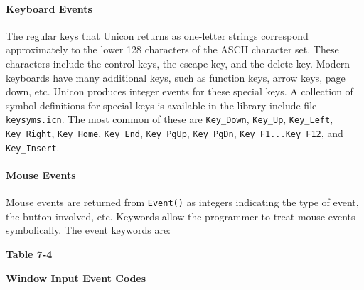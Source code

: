 \paragraph{Keyboard Events}
The regular keys that Unicon returns as one-letter strings correspond
approximately to the lower 128 characters of the ASCII character set.
These characters include the control keys, the escape key, and the
delete key. Modern keyboards have many additional keys, such as
function keys, arrow keys, {\textquotedbl}page down{\textquotedbl},
etc. Unicon produces integer events for these special keys. A
collection of symbol definitions for special keys is available in the
library include file \texttt{keysyms.icn}. The most common
of these are \texttt{Key\_Down}, \texttt{Key\_Up}, \texttt{Key\_Left},
\texttt{Key\_Right}, \texttt{Key\_Home}, \texttt{Key\_End},
\texttt{Key\_PgUp}, \texttt{Key\_PgDn}, \texttt{Key\_F1...Key\_F12},
and \texttt{Key\_Insert}.

\paragraph{Mouse Events}
Mouse events are returned from \texttt{Event()} as integers indicating
the type of event, the button involved, etc. Keywords allow the
programmer to treat mouse events symbolically. The event keywords are:

{\centering\sffamily\bfseries
Table 7-4
\par}

{\centering\sffamily\bfseries
Window Input Event Codes
\par}


